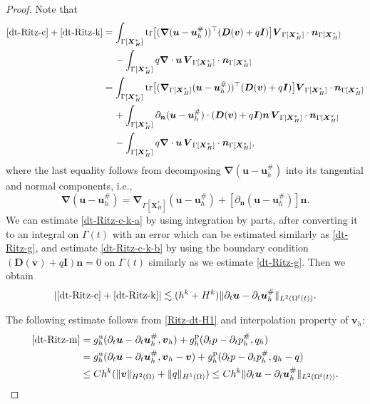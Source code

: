 \documentclass[11pt,reqno]{amsart}
\theoremstyle{definition}
\theoremstyle{plain}
\numberwithin{theorem}{section}
\numberwithin{proposition}{section}
\numberwithin{lemma}{section}
\numberwithin{equation}{section}
\newcommand{\bs}[1]{\boldsymbol{#1}}
\newcommand{\uu}[1]  {{\bs{#1}} }
\newcommand{\grad}   { \uu{\nabla}    }
\newcommand{\bv}{{\bs v}}
\renewcommand{\(}{\bigl(}
\renewcommand{\)}{\bigr)}
\begin{document}
\begin{proof}
Note that 
\begin{subequations}
\begin{align}
\eqref{dt-Ritz-c} + \eqref{dt-Ritz-k} 
& = \int_{\Gamma[\bs X_H^*]} {\rm tr}\big[ (\grad({\bs u}-{\bs u}_h^\#))^{\top} ({\bs D}({\bs v}) +q{\bs I} ) \big]{\bs V}_{\Gamma[\bs X_H^*]}\cdot{\bs n}_{\Gamma[\bs X_H^*]} \notag\\
&\quad\, 
- \int_{\Gamma[\bs X_H^*]} q \grad\cdot{\bs u} \, {\bs V}_{\Gamma[\bs X_H^*]}\cdot{\bs n}_{\Gamma[\bs X_H^*]} \notag\\ 
& = \int_{\Gamma[\bs X_H^*]} {\rm tr}\big[ (\grad_{\Gamma[\bs X_H^*]}({\bs u}-{\bs u}_h^\#))^{\top} ({\bs D}({\bs v}) +q{\bs I} ) \big]{\bs V}_{\Gamma[\bs X_H^*]}\cdot{\bs n}_{\Gamma[\bs X_H^*]} 
\label{dt-Ritz-c-k-a}\\ 
&\quad\, + \int_{\Gamma[\bs X_H^*]}  \partial_{\bs n}({\bs u}-{\bs u}_h^\#) \cdot ({\bs D}({\bs v}) +q{\bs I} ){\bs n} \, {\bs V}_{\Gamma[\bs X_H^*]}\cdot{\bs n}_{\Gamma[\bs X_H^*]} 
\label{dt-Ritz-c-k-b}\\
&\quad\, 
- \int_{\Gamma[\bs X_H^*]} q \grad\cdot{\bs u} \, {\bs V}_{\Gamma[\bs X_H^*]}\cdot{\bs n}_{\Gamma[\bs X_H^*]} \label{dt-Ritz-c-k-c} ,
\end{align} 
\end{subequations}
where the last equality follows from decomposing $\grad({\bs u}-{\bs u}_h^\#)$ into its tangential and normal components, i.e., 
$$
\grad({\bs u}-{\bs u}_h^\#)
= \grad_{\Gamma[\bs X_H^*]}({\bs u}-{\bs u}_h^\#) 
 + [\partial_{\bs n}({\bs u}-{\bs u}_h^\#)]{\bs n} . 
$$
We can estimate \eqref{dt-Ritz-c-k-a} by using integration by parts, after converting it to an integral on $\Gamma(t)$ with an error which can be estimated similarly as \eqref{dt-Ritz-g}, and estimate \eqref{dt-Ritz-c-k-b} by using the boundary condition $({\bs D}({\bs v}) +q{\bs I} ){\bs n}=0 $ on $\Gamma(t)$ similarly as we estimate \eqref{dt-Ritz-g}. Then we obtain 
\begin{align*}
|\eqref{dt-Ritz-c} + \eqref{dt-Ritz-k} |
\lesssim (h^k + H^k)  \|\partial_t{\bs u}-\partial_t{\bs u}_h^\#\|_{L^2(\Omega^{\rm f}(t))}.  
\end{align*} 

The following estimate follows from \eqref{Ritz-dt-H1} and interpolation property of $\bv_h$: 
\begin{align*}
\eqref{dt-Ritz-m}
&= 
g_h^{\rm u} (\partial_t{\bs u}-\partial_t{\bs u}_h^\#, {\bs v}_h ) + g_h^{\rm p} (\partial_tp - \partial_tp_h^\#, q_h ) \\
&= 
g_h^{\rm u} (\partial_t{\bs u}-\partial_t{\bs u}_h^\#, {\bs v}_h - {\bs v} ) + g_h^{\rm p} (\partial_tp - \partial_tp_h^\#, q_h -q ) \\
&\le Ch^k (\|{\bs v}\|_{H^2(\Omega)} +\|q\|_{H^1(\Omega)} ) 
\le Ch^k \|\partial_t{\bs u}-\partial_t{\bs u}_h^\#\|_{L^2(\Omega^{\rm f}(t))}.
\end{align*}


\end{proof}
\end{document}
